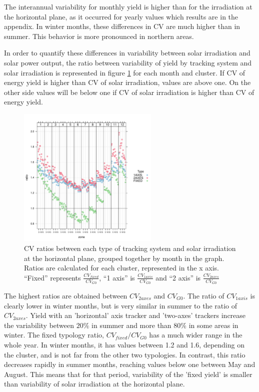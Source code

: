 The interannual variability for monthly yield is higher than for the irradiation at the horizontal plane, as it occurred for yearly values which results are in the appendix. In winter months, these differences in CV are much higher than in summer. This behavior is more pronounced in northern areas.

In order to quantify these differences in variability between solar irradiation and solar power output, the ratio between variability of yield by tracking system and solar irradiation is represented in figure \ref{ratiosCV} for each month and cluster. If CV of energy yield is higher than CV of solar irradiation, values are above one. On the other side values will be below one if CV of solar irradiation is higher than CV of energy yield. 

\begin{figure}
  \includegraphics[width=0.6\textwidth]{figs/capitulo5/dotplot_ratio_zone.pdf}
  \caption{CV ratios between each type of tracking system and solar irradiation at the horizontal plane, grouped together by month in the graph. Ratios are calculated for each cluster, represented in the x axis. ``Fixed'' represents $\frac{CV_{fixed}}{CV_{G0}}$, ``1 axis'' is $\frac{CV_{1axis}}{CV_{G0}}$ and ``2 axis'' is $\frac{CV_{2axes}}{CV_{G0}}$}
  \label{ratiosCV}
\end{figure}

The highest ratios are obtained between $CV_{2axes}$ and $CV_{G0}$. The ratio of $CV_{1axis}$ is clearly lower in winter months, but is very similar in summer to the ratio of $CV_{2axes}$. Yield with an 'horizontal' axis tracker and 'two-axes' trackers increase the variability between $20\%$ in summer and more than $80\%$ in some areas in winter. The fixed typology ratio, $CV_{fixed}/CV_{G0}$ has a much wider range in the whole year. In winter months, it has values between 1.2 and 1.6, depending on the cluster, and is not far from the other two typologies. In contrast, this ratio decreases rapidly in summer months, reaching values below one between May and August. This means that for that period, variability of the 'fixed yield' is smaller than variability of solar irradiation at the horizontal plane.

